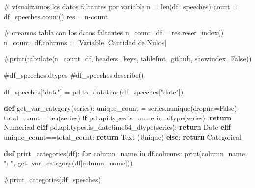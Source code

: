 \documentclass[
  letterpaper,
  DIV=11,
  numbers=noendperiod]{scrartcl}
\newenvironment{Shaded}{\begin{snugshade}}{\end{snugshade}}
\newcommand{\BuiltInTok}[1]{\textcolor[rgb]{0.00,0.23,0.31}{#1}}
\newcommand{\CommentTok}[1]{\textcolor[rgb]{0.37,0.37,0.37}{#1}}
\newcommand{\ControlFlowTok}[1]{\textcolor[rgb]{0.00,0.23,0.31}{\textbf{#1}}}
\newcommand{\KeywordTok}[1]{\textcolor[rgb]{0.00,0.23,0.31}{\textbf{#1}}}
\newcommand{\NormalTok}[1]{\textcolor[rgb]{0.00,0.23,0.31}{#1}}
\newcommand{\OperatorTok}[1]{\textcolor[rgb]{0.37,0.37,0.37}{#1}}
\newcommand{\StringTok}[1]{\textcolor[rgb]{0.13,0.47,0.30}{#1}}
\newcommand{\VariableTok}[1]{\textcolor[rgb]{0.07,0.07,0.07}{#1}}
\begin{document}
\begin{Shaded}
\begin{Highlighting}[]
\CommentTok{\# visualizamos los datos faltantes por variable}
\NormalTok{n }\OperatorTok{=} \BuiltInTok{len}\NormalTok{(df\_speeches)}
\NormalTok{count }\OperatorTok{=}\NormalTok{ df\_speeches.count()}
\NormalTok{res }\OperatorTok{=}\NormalTok{ n}\OperatorTok{{-}}\NormalTok{count}

\CommentTok{\# creamos tabla con los datos faltantes}
\NormalTok{n\_count\_df }\OperatorTok{=}\NormalTok{ res.reset\_index()}
\NormalTok{n\_count\_df.columns }\OperatorTok{=}\NormalTok{ [}\StringTok{\textquotesingle{}Variable\textquotesingle{}}\NormalTok{, }\StringTok{\textquotesingle{}Cantidad de Nulos\textquotesingle{}}\NormalTok{]}

\CommentTok{\#print(tabulate(n\_count\_df, headers=\textquotesingle{}keys\textquotesingle{}, tablefmt=\textquotesingle{}github\textquotesingle{}, showindex=False))}
\end{Highlighting}
\end{Shaded}

\begin{Shaded}
\begin{Highlighting}[]
\CommentTok{\#df\_speeches.dtypes}
\CommentTok{\#df\_speeches.describe()}
\end{Highlighting}
\end{Shaded}

\begin{Shaded}
\begin{Highlighting}[]
\NormalTok{df\_speeches[}\StringTok{"date"}\NormalTok{] }\OperatorTok{=}\NormalTok{ pd.to\_datetime(df\_speeches[}\StringTok{"date"}\NormalTok{])}

\KeywordTok{def}\NormalTok{ get\_var\_category(series):}
\NormalTok{    unique\_count }\OperatorTok{=}\NormalTok{ series.nunique(dropna}\OperatorTok{=}\VariableTok{False}\NormalTok{)}
\NormalTok{    total\_count }\OperatorTok{=} \BuiltInTok{len}\NormalTok{(series)}
    \ControlFlowTok{if}\NormalTok{ pd.api.types.is\_numeric\_dtype(series):}
        \ControlFlowTok{return} \StringTok{\textquotesingle{}Numerical\textquotesingle{}}
    \ControlFlowTok{elif}\NormalTok{ pd.api.types.is\_datetime64\_dtype(series):}
        \ControlFlowTok{return} \StringTok{\textquotesingle{}Date\textquotesingle{}}
    \ControlFlowTok{elif}\NormalTok{ unique\_count}\OperatorTok{==}\NormalTok{total\_count:}
        \ControlFlowTok{return} \StringTok{\textquotesingle{}Text (Unique)\textquotesingle{}}
    \ControlFlowTok{else}\NormalTok{:}
        \ControlFlowTok{return} \StringTok{\textquotesingle{}Categorical\textquotesingle{}}

\KeywordTok{def}\NormalTok{ print\_categories(df):}
    \ControlFlowTok{for}\NormalTok{ column\_name }\KeywordTok{in}\NormalTok{ df.columns:}
        \BuiltInTok{print}\NormalTok{(column\_name, }\StringTok{": "}\NormalTok{, get\_var\_category(df[column\_name]))}

\CommentTok{\#print\_categories(df\_speeches)}
\end{Highlighting}
\end{Shaded}
\end{document}
